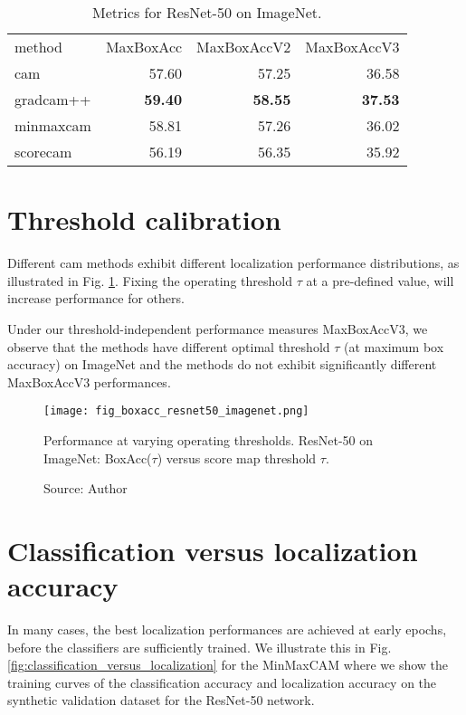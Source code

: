 \begin{table}[ht]
\centering
\begin{tabular}{lrrr}
\toprule
method & MaxBoxAcc & MaxBoxAccV2 & MaxBoxAccV3 \\
\cmidrule(lr){1-1} \cmidrule(lr){2-4}
cam & 57.60 & 57.25 & 36.58 \\
gradcam++ & \bfseries 59.40 & \bfseries 58.55 & \bfseries 37.53 \\
minmaxcam & 58.81 & 57.26 & 36.02 \\
scorecam & 56.19 & 56.35 & 35.92 \\
\bottomrule
\end{tabular}
\caption[Metrics for ResNet-50 on ImageNet]{Metrics for ResNet-50 on ImageNet.}
\label{tab:metrics_resnet50_imagenet}
\end{table}


\section{Threshold calibration}
Different \acrshort{cam} methods exhibit different localization performance distributions, as illustrated in Fig. \ref{fig:boxacc_resnet50_imagenet}. Fixing the operating threshold $\tau$ at a pre-defined value, will increase performance for others. 

Under our threshold-independent performance measures MaxBoxAccV3, we observe that the methods have different optimal threshold $\tau$ (at maximum box accuracy) on ImageNet and the methods do not exhibit significantly different MaxBoxAccV3 performances.

\begin{figure}[ht]
    \begin{center}       
    \texttt{[image: fig\_boxacc\_resnet50\_imagenet.png]}
    \caption[ResNet-50 BoxAcc on ImageNet]{Performance at varying operating thresholds. ResNet-50 on ImageNet: BoxAcc($\tau$) versus score map threshold $\tau$.}
    \caption*{Source: Author}
    \label{fig:boxacc_resnet50_imagenet}
    \end{center}
\end{figure}

\section{Classification versus localization accuracy}
In many cases, the best localization performances are achieved at early epochs, before the classifiers are sufficiently trained. We illustrate this in Fig. \ref{fig:classification_versus_localization} for the MinMaxCAM where we show the training curves of the classification accuracy and localization accuracy on the synthetic validation dataset for the ResNet-50 network. 

